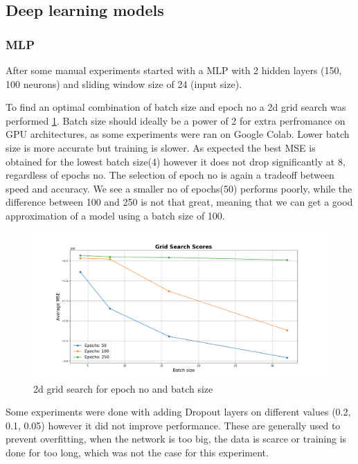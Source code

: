 \documentclass[12pt]{article}
\begin{document}
  \subsection{Deep learning models}

  \subsubsection{MLP}
  After some manual experiments started with a MLP with 2 hidden layers (150, 100 neurons) and sliding window
  size of 24 (input size). 

  To find an optimal combination of batch size and epoch no a 2d grid search was performed \ref{fig:epoch_batch}.
  Batch size should ideally be a power of 2 for extra perfromance on GPU architectures, as some 
  experiments were ran on Google Colab. Lower batch size is more accurate but training is slower\cite{batch_size}.
  As expected the best MSE is obtained for the lowest batch size(4) however it does not drop significantly
  at 8, regardless of epochs no. The selection of epoch no is again a tradeoff between speed and accuracy. 
  We see a smaller no of epochs(50) performs poorly, while the difference between 100 and 250 is not that great,
  meaning that we can get a good approximation of a model using a batch size of 100.

  \begin{figure}
    \includegraphics[width=\linewidth]{resources/mlp/epochs_batch.png}
    \caption{2d grid search for epoch no and batch size}
    \label{fig:epoch_batch}
  \end{figure}

  Some experiments were done with adding Dropout layers on different values (0.2, 0.1, 0.05) however it did 
  not improve performance. These are generally used to prevent overfitting, when the network is too big, the 
  data is scarce or training is done for too long\cite{dropout}, which was not the case for this experiment.
\end{document}
